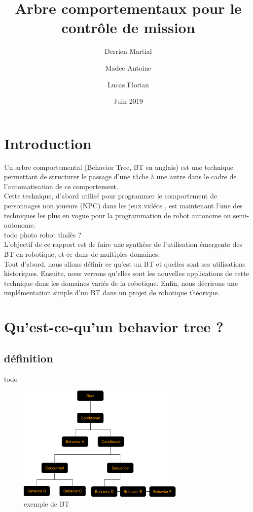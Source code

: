 \documentclass[titlepage]{article}
\title{Arbre comportementaux pour le contr\^ole de mission}
\author{
	Derrien Martial \\
	\and
	Madec Antoine \\
	\and
	Lucas Florian
}
\date{Juin 2019}
\begin{document}
	\maketitle
	\tableofcontents
	\hypersetup{linktocpage}
	
	\clearpage
	\section{Introduction}
	Un arbre comportemental (Behavior Tree, BT en anglais) est une
	technique permettant de structurer le passage d'une tâche à une autre dans 
	le cadre de l'automatisation de ce comportement.
	\\
	Cette technique, d'abord utilisé pour programmer le comportement de personnages non joueurs (NPC) dans les jeux vidéos \cite{wikipedia_BT}, est maintenant l'une des techniques les plus en vogue pour la programmation de robot autonome ou semi-autonome\cite{ros.org}.
	\\
	todo photo robot thalès ? 
	\\
	L'objectif de ce rapport est de faire une synthèse de l'utilisation émergente des BT en robotique, et ce dans de multiples domaines.
	\\
	Tout d'abord, nous allons définir ce qu'est un BT et quelles sont ses utilisations historiques. Ensuite, nous verrons qu'elles sont les nouvelles applications de cette technique dans les domaines variés de la robotique. Enfin, nous décrirons une implémentation simple d'un BT dans un projet de robotique théorique.
	\clearpage
	\section{Qu'est-ce-qu'un behavior tree ?}
		\subsection{définition}
	todo
	\\
	\begin{figure}[h!]
		\includegraphics[width=\linewidth]{img/behavior_trees_example.png}
		\caption{exemple de BT \cite{rasmussen}}
		\label{fig:BT1}
	\end{figure}
	\\
\end{document}
